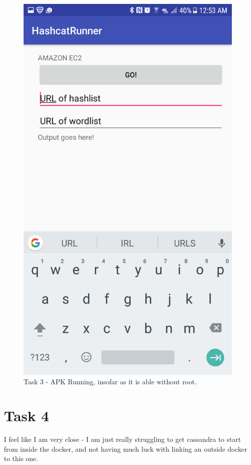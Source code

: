 \documentclass{article}
\begin{document}
	\begin{figure}[ht]
        \centerline{
            \includegraphics[width=7.5in]{img/t3s1.png}
        }
		\centering
		\caption{Task 3 - APK Running, insofar as it is able without root.}
	\end{figure}


\section{Task 4}
I feel like I am very close - I am just really struggling to get cassandra to start from inside the docker, and not having much luck with linking an outside docker to this one.
\end{document}
